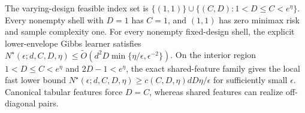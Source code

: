 The varying-design feasible index set is \(\{(1,1)\}\cup\{(C,D):1<D\le C<e^\eta\}\). Every nonempty shell with \(D=1\) has \(C=1\), and \((1,1)\) has zero minimax risk and sample complexity one. For every nonempty fixed-design shell, the explicit lower-envelope Gibbs learner satisfies \(N^\star(\epsilon;d,C,D,\eta)\le\widetilde O(d^2D\min\{\eta/\epsilon,\epsilon^{-2}\})\). On the interior region \(1<D\le C<e^\eta\) and \(2D-1<e^\eta\), the exact shared-feature family gives the local fast lower bound \(N^\star(\epsilon;d,C,D,\eta)\ge c(C,D,\eta)dD\eta/\epsilon\) for sufficiently small \(\epsilon\). Canonical tabular features force \(D=C\), whereas shared features can realize off-diagonal pairs.